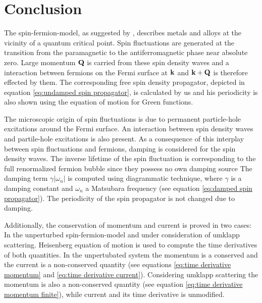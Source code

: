 %
%
\chapter{Conclusion}
\label{ch:conclusion}
%
%
The spin-fermion-model, as suggested by \cite{Abanov&Chubukov&Schmalian}, describes metals and alloys at the vicinity of a quantum critical point.
Spin fluctuations are generated at the transition from the paramagnetic to the antiferromagnetic phase near absolute zero.
Large momentum $\vb{Q}$ is carried from these spin density waves and a interaction between fermions on the Fermi surface at $\vb{k}$ and $\vb{k}+\vb{Q}$ is therefore effected by them.
The corresponding free spin density propagator, depicted in equation \eqref{eq:undamped spin propagator}, is calculated by us and his periodicity is also shown using the equation of motion for Green functions.

The microscopic origin of spin fluctuations is due to permanent particle-hole excitations around the Fermi surface.
An interaction between spin density waves and partile-hole excitations is also present.
As a consequence of this interplay between spin fluctuations and fermions, damping is considered for the spin density waves.
The inverse lifetime of the spin fluctuation is corresponding to the full renormalized fermion bubble since they possess no own damping source
The damping term $\gamma|\omega_{n}|$ is computed using diagrammatic technique, where $\gamma$ is a damping constant and $\omega_{n}$ a Matsubara frequency (see equation \eqref{eq:damped spin propagator}).
The periodicity of the spin propagator is not changed due to damping.

Additionally, the conservation of momentum and current is proved in two cases: In the unperturbed spin-fermion-model and under consideration of umklapp scattering.
Heisenberg equation of motion is used to compute the time derivatives of both quantities.
In the unpertubated system the momentum is a conserved and the current is a non-conserved quantity (see equations \eqref{eq:time derivative momentum} and \eqref{eq:time derivative current}).
Considering umklapp scattering the momentum is also a non-conserved quantity (see equation \eqref{eq:time derivative momentum finite}), while current and its time derivative is unmodified.

